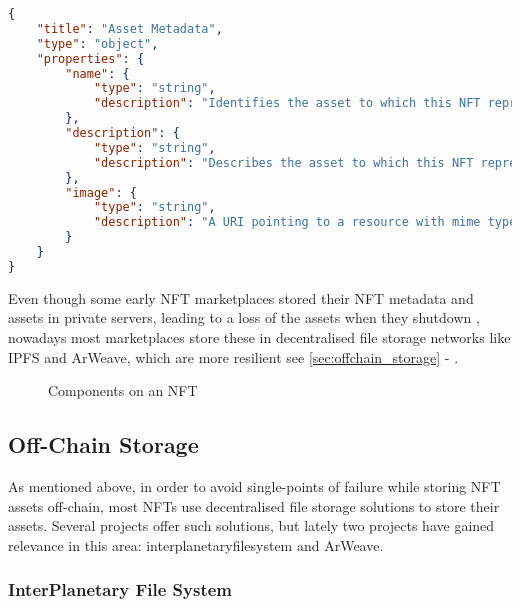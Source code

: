 


\begin{lstlisting}[language=json,firstnumber=1,caption={ERC721 Metadata JSON Schema}]
{
    "title": "Asset Metadata",
    "type": "object",
    "properties": {
        "name": {
            "type": "string",
            "description": "Identifies the asset to which this NFT represents"
        },
        "description": {
            "type": "string",
            "description": "Describes the asset to which this NFT represents"
        },
        "image": {
            "type": "string",
            "description": "A URI pointing to a resource with mime type image/* representing the asset to which this NFT represents. Consider making any images at a width between 320 and 1080 pixels and aspect ratio between 1.91:1 and 4:5 inclusive."
        }
    }
}
\end{lstlisting}

Even though some early NFT marketplaces stored their NFT metadata and assets in private servers, leading to a loss of the assets when they shutdown \cite{gallenHistoryNFTMarketplaces2023}, nowadays most marketplaces store these in decentralised file storage networks like IPFS and ArWeave, which are more resilient  see \autoref{sec:offchain_storage} - .


\begin{figure}[h]
    \centering
    
    \caption[Components on an NFT]{Components on an NFT}
    \label{fig:nftcomponents}
\end{figure}



\subsection{Off-Chain Storage}
\label{sec:offchain_storage}

As mentioned above, in order to avoid single-points of failure while storing NFT assets off-chain, most NFTs use decentralised file storage solutions to store their assets. Several projects offer such solutions, but lately two projects have gained relevance in this area: \gls{interplanetaryfilesystem} and ArWeave. 


\subsubsection{InterPlanetary File System}
\label{sec:ipfs}


